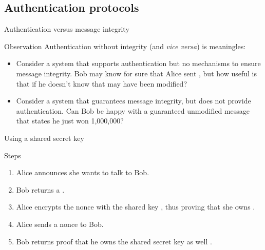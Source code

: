 \subsection{Authentication protocols}
\begin{slide}{Authentication versus message integrity}
  \begin{alertblock}{Observation}
    Authentication without integrity (and \emph{vice versa}) is meaningles:
    \begin{itemize}
    \item Consider a system that supports authentication but no mechanisms to ensure message integrity. Bob
      may know for sure that Alice sent , but how useful is that if he doesn't know that  may have
      been modified?
    \item Consider a system that guarantees message integrity, but does not provide authentication. Can Bob be
      happy with a guaranteed unmodified message that states he just won {\dollar}1,000,000?
    \end{itemize}
    
  \end{alertblock}
  
\end{slide}
\begin{slide}{Using a shared secret key}
  \begin{centerfig}
  \end{centerfig}
  
  \begin{block}{Steps}
    \begin{enumerate}
    \item Alice announces she wants to talk to Bob.
    \item Bob returns a .
    \item Alice encrypts the nonce with the shared key , thus proving that she owns 
      \mathexpr{\Rightarrow} .
    \item Alice sends a nonce to Bob.
    \item Bob returns proof that he owns the shared secret key as well \mathexpr{\Rightarrow} .
    \end{enumerate}
  \end{block}
\end{slide}
